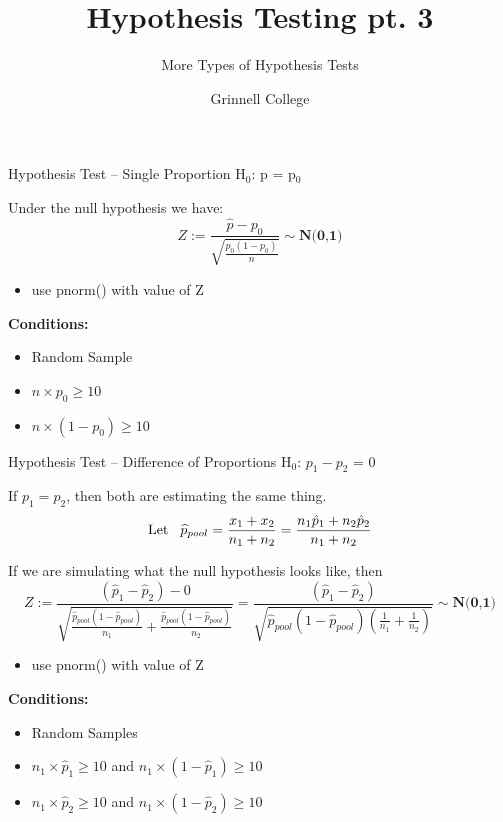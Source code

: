 \documentclass{beamer}
\title[Introduction to Statistics]{Hypothesis Testing pt. 3}
\subtitle{More Types of Hypothesis Tests}
\author{Grinnell College}
\date{}
\begin{document}
\begin{frame}
  \titlepage
\end{frame}

\begin{frame}{Hypothesis Test -- Single Proportion}
H$_0$: p = p$_0$ \vspace{4mm}

Under the null hypothesis we have:
\begin{equation*}
    Z := \frac{\hat{p} - p_0}{\sqrt{\frac{p_0(1-p_0)}{n}}} \sim \textbf{N(0,1)}
\end{equation*} \vspace{-4mm}
\begin{itemize}
    \item use pnorm() with value of Z
\end{itemize} \vspace{4mm}

\textbf{Conditions:}
\begin{itemize}
    \item Random Sample
    \item $n \times p_0 \geq 10$
    \item $n \times (1-p_0) \geq 10$
\end{itemize}
\end{frame}

\begin{frame}{Hypothesis Test -- Difference of Proportions}
H$_0$: $p_1 - p_2$ = 0 \vspace{4mm}

If $p_1 = p_2$, then both are estimating the same thing.
\begin{equation*}
    \text{Let} \hspace{3mm} \widehat{p}_{pool} = \frac{x_1 + x_2}{n_1 + n_2} = \frac{n_1\hat{p}_1 + n_2\hat{p}_2}{n_1 + n_2}
\end{equation*}

If we are simulating what the null hypothesis looks like, then
\begin{equation*}
    Z := \frac{(\hat{p}_1 - \hat{p}_2) - 0}{\sqrt{\frac{\widehat{p}_{pool}(1-\widehat{p}_{pool})}{n_1}+\frac{\widehat{p}_{pool}(1-\widehat{p}_{pool})}{n_2}}} = \frac{(\hat{p}_1 - \hat{p}_2)}{\sqrt{\widehat{p}_{pool}(1-\widehat{p}_{pool})(\frac{1}{n_1}+\frac{1}{n_2})}} \sim \textbf{N(0,1)}
\end{equation*} \vspace{-4mm}
\begin{itemize}
    \item use pnorm() with value of Z
\end{itemize}

\textbf{Conditions:}
\begin{itemize}
    \item Random Samples
    \item $n_1 \times \widehat{p}_1 \geq 10$ and $n_1 \times (1-\widehat{p}_1) \geq 10$
    \item $n_1 \times \widehat{p}_2 \geq 10$ and $n_1 \times (1-\widehat{p}_2) \geq 10$
\end{itemize}
\end{frame}
\end{document}
